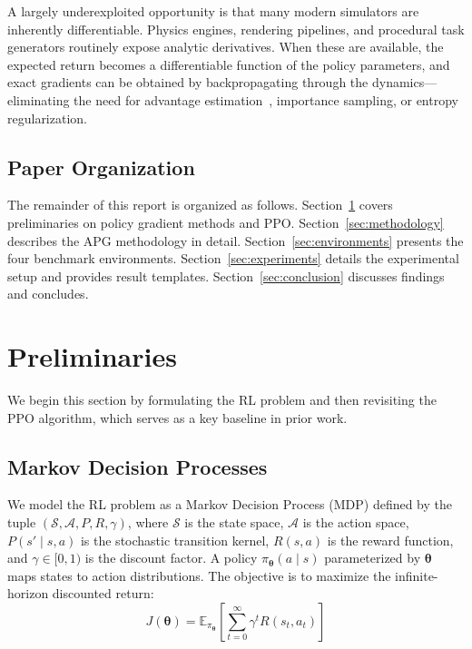 \documentclass[11pt,a4paper]{article}
\newcommand{\E}{\mathbb{E}}
\newcommand{\cA}{\mathcal{A}}
\newcommand{\cS}{\mathcal{S}}
\newcommand{\btheta}{\bm{\theta}}
\begin{document}
A largely underexploited opportunity is that many modern simulators are inherently differentiable. Physics engines, rendering pipelines, and procedural task generators routinely expose analytic derivatives. When these are available, the expected return becomes a differentiable function of the policy parameters, and exact gradients can be obtained by backpropagating through the dynamics—eliminating the need for advantage estimation~\cite{schulman2016gae}, importance sampling, or entropy regularization.

\subsection{Paper Organization}
\label{sec:organization}

The remainder of this report is organized as follows. Section~\ref{sec:preliminaries} covers preliminaries on policy gradient methods and PPO. Section~\ref{sec:methodology} describes the APG methodology in detail. Section~\ref{sec:environments} presents the four benchmark environments. Section~\ref{sec:experiments} details the experimental setup and provides result templates. Section~\ref{sec:conclusion} discusses findings and concludes.

\section{Preliminaries}
\label{sec:preliminaries}
We begin this section by formulating the RL problem and then revisiting the PPO algorithm, which serves as a key baseline in prior work.
\subsection{Markov Decision Processes}
\label{sec:mdp}

We model the RL problem as a Markov Decision Process (MDP) defined by the tuple $(\cS, \cA, P, R, \gamma)$, where $\cS$ is the state space, $\cA$ is the action space, $P(s' \mid s, a)$ is the stochastic transition kernel, $R(s, a)$ is the reward function, and $\gamma \in [0, 1)$ is the discount factor. A policy $\pi_{\btheta}(a \mid s)$ parameterized by $\btheta$ maps states to action distributions. The objective is to maximize the infinite-horizon discounted return:
\begin{equation}
  J(\btheta) = \E_{\pi_{\btheta}}\left[\sum_{t=0}^{\infty} \gamma^t R(s_t, a_t)\right]
  \label{eq:objective}
\end{equation}
\end{document}
